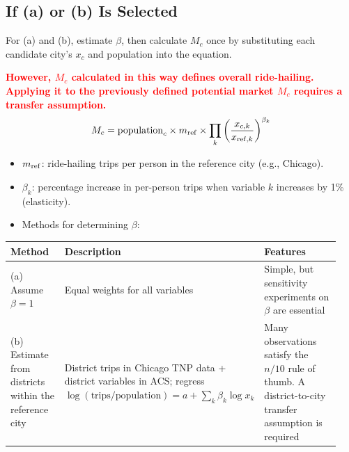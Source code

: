 \documentclass[10pt,a4paper]{article}
\begin{document}
\begin{mdframed}[linecolor=red,linewidth=0.6pt,innerleftmargin=8pt,innerrightmargin=8pt]
\color{gray}
\section{If (a) or (b) Is Selected}
For (a) and (b), estimate $\beta$, then calculate $M_c$ once by substituting each candidate city's $x_c$ and population into the equation.

\textcolor{red}{\textbf{However, $M_c$ calculated in this way defines overall ride-hailing. Applying it to the previously defined potential market $M_c$ requires a transfer assumption.}}
\[
M_c=\text{population}_c\times m_{\rm ref}\times\prod_k\left(\frac{x_{c,k}}{x_{{\rm ref},k}}\right)^{\beta_k}
\]
\begin{itemize}
\item $m_{\rm ref}$: ride-hailing trips per person in the reference city (e.g., Chicago).
\item $\beta_k$: percentage increase in per-person trips when variable $k$ increases by 1\% (elasticity).
\item Methods for determining $\beta$:
\end{itemize}
{\footnotesize
\begin{longtable}{@{}L{0.21\linewidth}L{0.39\linewidth}L{0.34\linewidth}@{}}
\toprule Method & Description & Features\\\midrule\endhead\bottomrule\endlastfoot
(a) Assume $\beta=1$ & Equal weights for all variables & Simple, but sensitivity experiments on $\beta$ are essential\\
(b) Estimate from districts within the reference city & District trips in Chicago TNP data + district variables in ACS; regress $\log(\text{trips}/\text{population})=a+\sum_k\beta_k\log x_k$ & Many observations satisfy the $n/10$ rule of thumb. A district-to-city transfer assumption is required\\
\end{longtable}}

\end{mdframed}
\end{document}
